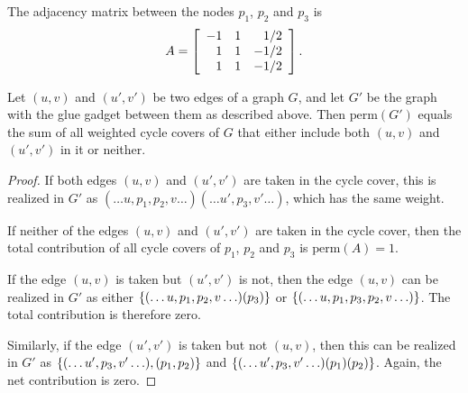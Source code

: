 \begin{center}
\end{center}
The adjacency matrix between the nodes $p_1$, $p_2$ and $p_3$ is 
\[
A = \left[\begin{array}{rrr}
-1 & 1 & 1/2\\
1 & 1 & -1/2\\
1 & 1 & -1/2
\end{array}\right].
\]

\noindent
\begin{claim}
Let $(u,v)$ and $(u',v')$ be two edges of a graph $G$, and let $G'$ be the graph with the glue gadget between them as described above. 
Then $\mathrm{perm}(G')$ equals the sum of all weighted cycle covers of $G$ that either include both $(u,v)$ and $(u',v')$ in it or neither. 
\end{claim}
\begin{proof}
If both edges $(u,v)$ and $(u',v')$ are taken in the cycle cover, this is realized in $G'$ as ${(\ldots u,p_1, p_2, v \ldots) (\ldots u', p_3, v' \ldots)}$, which has the same weight.  

If neither of the edges $(u,v)$ and $(u',v')$ are taken in the cycle cover, then the total contribution of all cycle covers of $p_1$, $p_2$ and $p_3$ is $\mathrm{perm}(A) = 1$. 

If the edge $(u,v)$ is taken but $(u',v')$ is not, then the edge $(u,v)$ can be realized in $G'$ as either $\left\{(\ldots u,p_1,p_2,v \ldots) (p_3)\right\}$ or $\left\{(\ldots u,p_1,p_3,p_2,v \ldots )\right\}$. 
The total contribution is therefore zero. 

Similarly, if the edge $(u',v')$ is taken but not $(u,v)$, then this can be realized in $G'$ as $\left\{(\ldots u',p_3,v' \ldots),(p_1,p_2)\right\}$ and $\left\{(\ldots u',p_3, v' \ldots) (p_1) (p_2)\right\}$. 
Again, the net contribution is zero.  
\end{proof}


